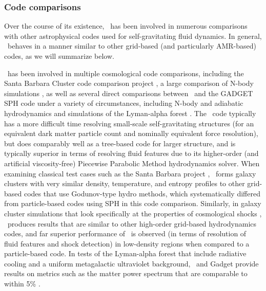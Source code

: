 \subsubsection{Code comparisons}
\label{sec.tests.compare}

Over the course of its existence, \enzo\ has been involved in numerous
comparisons with other astrophysical codes used for self-gravitating
fluid dynamics.  In general, \enzo\ behaves in a manner similar to other
grid-based (and particularly AMR-based) codes, as we will summarize below.

\enzo\ has been involved in multiple cosmological code comparisons,
including the Santa Barbara Cluster code comparison project
\citep{SantaBarbara}, a large comparison of N-body simulations
\citep{2008CS&D....1a5003H}, as well as several direct comparisons
between \enzo\ and the GADGET SPH code under a variety of
circumstances, including N-body and adiabatic hydrodynamics
\citep{2005ApJS..160....1O,2005MNRAS.364..909V, 2011MNRAS.418..960V}
and simulations of the Lyman-alpha forest \citep{2007MNRAS.374..196R}.
The \enzo\ code typically has a more difficult time resolving
small-scale self-gravitating structures (for an equivalent dark matter
particle count and nominally equivalent force resolution), but does
comparably well as a tree-based code for larger structure, and is
typically superior in terms of resolving fluid features due to its
higher-order (and artificial viscosity-free) Piecewise Parabolic
Method hydrodynamics solver.  When examining classical test cases such
as the Santa Barbara project \citep{SantaBarbara}, \enzo\ forms galaxy
clusters with very similar density, temperature, and entropy profiles
to other grid-based codes that use Godunov-type hydro methods, which
systematically differed from particle-based codes using SPH in this
code comparison.  Similarly, in galaxy cluster simulations that look
specifically at the properties of cosmological shocks
\citep[e.g.][]{2011MNRAS.418..960V}, \enzo\ produces results that are
similar to other high-order grid-based hydrodynamics codes, and far
superior performance of \enzo\ is observed (in terms of resolution of
fluid features and shock detection) in low-density regions when
compared to a particle-based code.  In tests of the Lyman-alpha forest
that include radiative cooling and a uniform metagalactic ultraviolet
background, \enzo\ and Gadget provide results on metrics such as the
matter power spectrum that are comparable to within 5\%
\citep{2007MNRAS.374..196R}.

